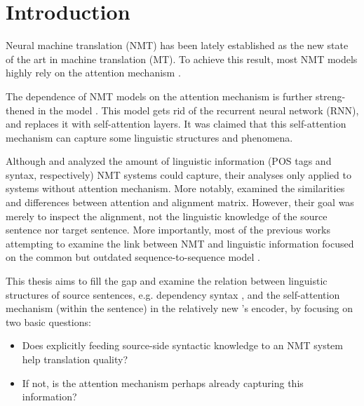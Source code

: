 \chapter*{Introduction}


Neural machine translation (NMT) has been lately established as the new state of the art in machine translation (MT).
To achieve this result, most NMT models highly rely on the attention mechanism \citep{bahdanau:etal:attention:iclr:2015}.

The dependence of NMT models on the attention mechanism is further streng-thened in the \transformer model \citep{DBLP:conf/nips/VaswaniSPUJGKP17}.
This model gets rid of the recurrent neural network (RNN), and replaces it with self-attention layers.
It was claimed that this self-attention mechanism can capture some linguistic structures and phenomena.

Although \cite{DBLP:conf/acl/BelinkovDDSG17} and \cite{DBLP:conf/emnlp/ShiPK16} analyzed the amount of linguistic information (POS tags and syntax, respectively) NMT systems could capture, their analyses only applied to systems without attention mechanism.
More notably, \cite{DBLP:conf/ijcnlp/GhaderM17} examined the similarities and differences between attention and alignment matrix.
However, their goal was merely to inspect the alignment, not the linguistic knowledge of the source sentence nor target sentence.
More importantly, most of the previous works attempting to examine the link between NMT and linguistic information focused on the common but outdated sequence-to-sequence model \citep{DBLP:conf/nips/SutskeverVL14}.

This thesis aims to fill the gap and examine the relation between linguistic structures of source sentences, e.g. dependency syntax \citep{melvcuk1988dependency}, and the self-attention mechanism (within the sentence) in the relatively new \transformer's encoder, by focusing on two basic questions:
\begin{itemize}
	\item Does explicitly feeding source-side syntactic knowledge to an NMT system help translation quality?
    \item If not, is the attention mechanism perhaps already capturing this information?
\end{itemize}

